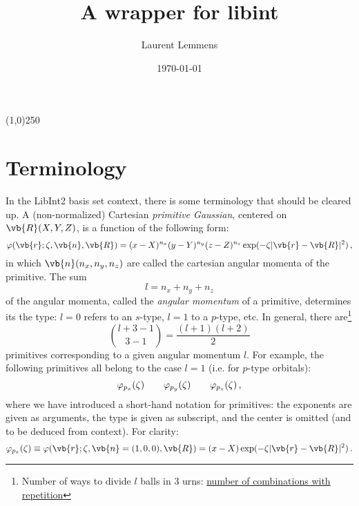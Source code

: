 \documentclass[12pt]{article}
\title{A wrapper for libint}
\author{Laurent Lemmens}
\date{\today \hspace{6pt} \currenttime}
\begin{document}
\maketitle

\begin{center}
\line(1,0){250}
\end{center}

\tableofcontents
\newpage



\section{Terminology}
    In the LibInt2 basis set context, there is some terminology that should be cleared up. A (non-normalized) Cartesian \textit{primitive Gaussian}, centered on $\vb{R}(X,Y,Z)$, is a function of the following form:
    \begin{equation}
        \varphi(\vb{r}; \zeta, \vb{n}, \vb{R}) = (x - X)^{n_x} (y - Y)^{n_y} (z - Z)^{n_z} \exp(-\zeta |\vb{r}-\vb{R}|^2) \thinspace ,
    \end{equation}
    in which $\vb{n}(n_x, n_y, n_z)$ are called the cartesian angular momenta of the primitive. The sum
    \begin{equation}
        l = n_x + n_y + n_z
    \end{equation}
    of the angular momenta, called the \textit{angular momentum} of a primitive, determines its the type: $l=0$ refers to an $s$-type, $l=1$ to a $p$-type, etc. In general, there are\footnote{Number of ways to divide $l$ balls in $3$ urns: \href{https://en.wikipedia.org/wiki/Combination\#Number\_of\_combinations\_with\_repetition}{number of combinations with repetition}}
    \begin{equation}
        \binom{l + 3 - 1}{3 - 1} = \frac{(l+1)(l+2)}{2}
    \end{equation}
    primitives corresponding to a given angular momentum $l$. For example, the following primitives all belong to the case $l=1$ (i.e. for $p$-type orbitals):
    \begin{equation}
        \varphi_{p_x}(\zeta) \qquad \varphi_{p_y}(\zeta) \qquad \varphi_{p_z}(\zeta) \thinspace ,
    \end{equation}
    where we have introduced a short-hand notation for primitives: the exponents are given as arguments, the type is given as subscript, and the center is omitted (and to be deduced from context). For clarity:
    \begin{equation}
        \varphi_{p_x}(\zeta) \equiv \varphi(\vb{r}; \zeta, \vb{n}=(1,0,0), \vb{R}) = (x - X) \exp(-\zeta |\vb{r}-\vb{R}|^2) \thinspace .
    \end{equation}
\end{document}
